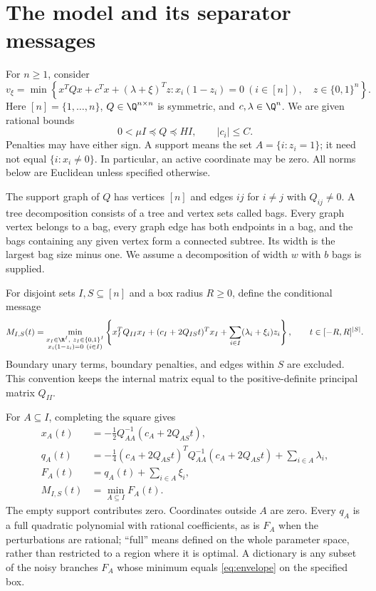 \section{The model and its separator messages}\label{sec:model}
For $n\ge1$, consider
\begin{equation}\label{eq:problem}
 v_\xi=\min\left\{x^TQx+c^Tx+(\lambda+\xi)^Tz:
 x_i(1-z_i)=0\ (i\in[n]),\quad z\in\{0,1\}^n\right\}.
\end{equation}
Here $[n]=\{1,\ldots,n\}$, $Q\in\Q^{n\times n}$ is symmetric, and
$c,\lambda\in\Q^n$. We are given rational bounds
\begin{equation}\label{eq:spectral}
 0<\mu I\preceq Q\preceq HI,\qquad |c_i|\le C.
\end{equation}
Penalties may have either sign. A support means the set $A=\{i:z_i=1\}$;
it need not equal $\{i:x_i\ne0\}$. In particular, an active coordinate
may be zero. All norms below are Euclidean unless specified otherwise.

The support graph of $Q$ has vertices $[n]$ and edges $ij$ for $i\ne j$
with $Q_{ij}\ne0$. A tree decomposition consists of a tree and vertex
sets called bags. Every graph vertex belongs to a bag, every graph edge
has both endpoints in a bag, and the bags containing any given vertex
form a connected subtree. Its width is the largest bag size minus one.
We assume a decomposition of width $w$ with $b$ bags is supplied.

For disjoint sets $I,S\subseteq[n]$ and a box radius $R\ge0$, define the
conditional message
\begin{equation}\label{eq:message}
 M_{I,S}(t)=\min_{\substack{x_I\in\R^I,\ z_I\in\{0,1\}^I\\
                     x_i(1-z_i)=0\ (i\in I)}}
 \left\{x_I^TQ_{II}x_I+(c_I+2Q_{IS}t)^Tx_I
           +\sum_{i\in I}(\lambda_i+\xi_i)z_i\right\},
 \qquad t\in[-R,R]^{|S|}.
\end{equation}
Boundary unary terms, boundary penalties, and edges within $S$ are
excluded. This convention keeps the internal matrix equal to the
positive-definite principal matrix $Q_{II}$.

For $A\subseteq I$, completing the square gives
\begin{align}
 x_A(t)&=-\tfrac12Q_{AA}^{-1}(c_A+2Q_{AS}t),\label{eq:optimizer}\\
 q_A(t)&=-\tfrac14(c_A+2Q_{AS}t)^TQ_{AA}^{-1}
                    (c_A+2Q_{AS}t)+\sum_{i\in A}\lambda_i,\label{eq:branch}\\
 F_A(t)&=q_A(t)+\sum_{i\in A}\xi_i,\label{eq:noisybranch}\\
 M_{I,S}(t)&=\min_{A\subseteq I}F_A(t).
 \label{eq:envelope}
\end{align}
The empty support contributes zero. Coordinates outside $A$ are zero.
Every $q_A$ is a full quadratic polynomial with rational coefficients, as
is $F_A$ when the perturbations are rational;
``full'' means defined on the whole parameter space, rather than restricted
to a region where it is optimal. A dictionary is any subset of the noisy branches $F_A$
whose minimum equals \eqref{eq:envelope} on the specified box.


